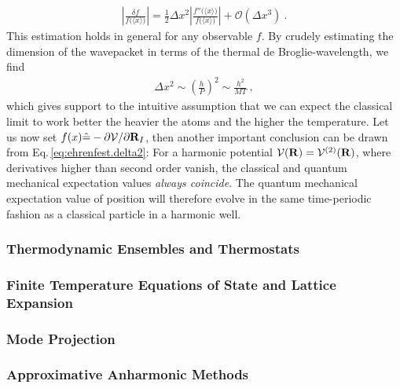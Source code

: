 \begin{align}
  \left\lvert \frac{\delta f}{f \bm ( \langle x \rangle \bm{)}} \right\rvert
  = \frac{1}{2} \Delta x^2 \left\lvert \frac{f'' \bm ( \langle x \rangle \bm{)}}{f \bm ( \langle x \rangle \bm{)}} \right\rvert
+ \mathcal{O}(\Delta x^3)~.
  \label{eq:ehrenfest.delta2}
\end{align}
This estimation holds in general for any observable $f$.
By crudely estimating the dimension of the wavepacket in terms of the thermal de Broglie-wavelength, we find
\begin{align}
  \Delta x^2 
    \sim \left( \frac{h}{P} \right)^2
    \sim \frac{h^2}{MT}~,
  \label{eq:ehrenfest:dimension}
\end{align}
which gives support to the intuitive assumption that we can expect the classical limit to work better the heavier the atoms and the higher the temperature.
Let us now set $f(x) \hat = -\partial \mathcal V / \partial {\bf R}_I$, then another important conclusion can be drawn from Eq.\,\eqref{eq:ehrenfest.delta2}: For a harmonic potential $\mathcal V ({\bf R}) = \mathcal V^{(2)} ({\bf R})$, where derivatives higher than second order vanish, the classical and quantum mechanical expectation values \emph{always coincide}. The quantum mechanical expectation value of position will therefore evolve in the same time-periodic fashion as a classical particle in a harmonic well.


\subsubsection{Thermodynamic Ensembles and Thermostats}
\subsubsection{Finite Temperature Equations of State and Lattice Expansion}
\subsubsection{Mode Projection}
\subsubsection{Approximative Anharmonic Methods}

